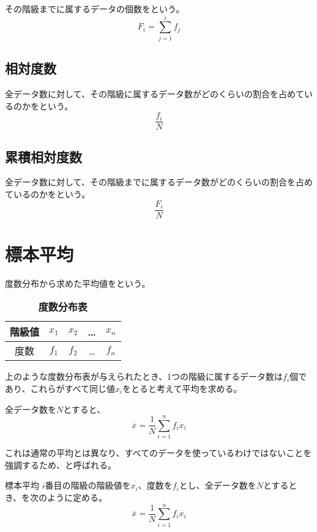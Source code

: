 \documentclass[../../../topic_statistics]{subfiles}
\begin{document}
その階級までに属するデータの個数をという。
\begin{equation*}
  F_i = \sum_{j=1}^{i} f_j
\end{equation*}

\subsection{相対度数}

全データ数に対して、その階級に属するデータ数がどのくらいの割合を占めているのかをという。
\begin{equation*}
  \frac{f_i}{N}
\end{equation*}

\subsection{累積相対度数}

全データ数に対して、その階級までに属するデータ数がどのくらいの割合を占めているのかをという。
\begin{equation*}
  \frac{F_i}{N}
\end{equation*}

\sectionline
\section{標本平均}

度数分布から求めた平均値をという。

\begin{table}[htbp]
  \centering
  \caption*{\bfseries 度数分布表}
  \begin{tabular}{ccccc}
    \hline
    階級値 & $x_1$ & $x_2$ & \ldots & $x_n$ \\
    \hline
    度数 & $f_1$ & $f_2$ & \ldots & $f_n$ \\
    \hline
  \end{tabular}
\end{table}

上のような度数分布表が与えられたとき、1つの階級に属するデータ数は$f_i$個であり、これらがすべて同じ値$x_i$をとると考えて平均を求める。

全データ数を$N$とすると、
\begin{equation*}
  \overline{x} = \frac{1}{N} \sum_{i=1}^{n} f_i x_i
\end{equation*}

これは通常の平均とは異なり、すべてのデータを使っているわけではないことを強調するため、と呼ばれる。

\begin{definition}{標本平均}
  $i$番目の階級の階級値を$x_i$、度数を$f_i$とし、全データ数を$N$とするとき、を次のように定める。
  \begin{equation*}
    \overline{x} = \frac{1}{N} \sum_{i=1}^{n} f_i x_i
  \end{equation*}
\end{definition}
\end{document}
